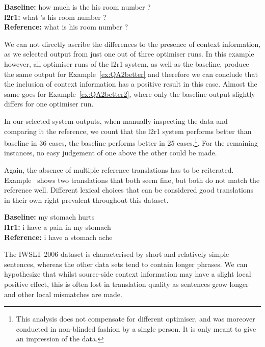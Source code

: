 \begin{exe}
\footnotesize
\ex \textbf{Baseline:} how much is the his room number ?  \\
\textbf{l2r1:} what 's his room number ?  \\
\textbf{Reference:} what is his room number ?
\label{ex:QA2better2}
\end{exe}

We can not directly ascribe the differences to the presence of context
information, as we selected output from just one out of three optimiser runs.
In this example however, all optimiser runs of the l2r1 system, as well as the
baseline, produce the same output for Example~\ref{ex:QA2better} and therefore
we can conclude that the inclusion of context information has a positive result
in this case. Almost the same goes for Example~\ref{ex:QA2better2}, where only
the baseline output slightly differs for one optimiser run.

In our selected system outputs, when manually inspecting the data and comparing
it the reference, we count that the l2r1 system performs better than baseline
in 36 cases, the baseline performs better in 25 cases.\footnote{This analysis
does not compensate for different optimiser, and was moreover conducted in
non-blinded fashion by a single person. It is only meant to give an impression
of the data.}. For the remaining instances, no easy judgement of one above the
other could be made. 

Again, the absence of multiple reference translations has to be reiterated.
Example~\label{ex:QA2allnice} shows two translations that both seem fine, but
both do not match the reference well. Different lexical choices that can be
considered good translations in their own right prevalent throughout this
dataset.

\begin{exe}
\footnotesize
\ex \textbf{Baseline:} my stomach hurts  \\
\textbf{l1r1:} i have a pain in my stomach \\
\textbf{Reference:} i have a stomach ache
\label{ex:QA2allnice}
\end{exe}

The IWSLT 2006 dataset is characterised by short and relatively simple
sentences, whereas the other data sets tend to contain longer phrases. We can
hypothesize that whilst source-side context information may have a slight local
positive effect, this is often lost in translation quality as sentences grow
longer and other local mismatches are made.


